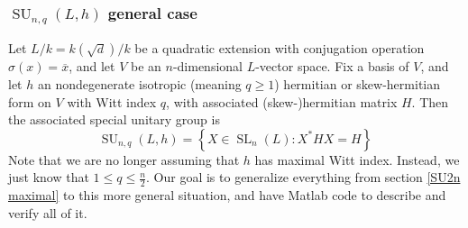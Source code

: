 \documentclass[12pt]{article}
\theoremstyle{definition}
\numberwithin{theorem}{subsection}
\newcommand{\sig}{\sigma}
\newcommand{\lb}{\left\{}
\newcommand{\rb}{\right\}}
\newcommand{\noi}{\noindent}
\newcommand{\ov}{\overline}
\DeclareMathOperator{\SL}{SL}
\DeclareMathOperator{\SU}{SU}
\begin{document}
\subsubsection{$\SU_{n,q}(L,h)$ general case}
\label{SUnq Lie algebra}

\noi Let $L/k = k(\sqrt{d})/k$ be a quadratic extension with conjugation operation $\sig(x) = \ov x$, and let $V$ be an $n$-dimensional $L$-vector space. Fix a basis of $V$, and let $h$ an nondegenerate isotropic (meaning $q \ge 1$) hermitian or skew-hermitian form on $V$ with Witt index $q$, with associated (skew-)hermitian matrix $H$. Then the associated special unitary group is
\[
	\SU_{n,q}(L,h) = \lb X \in \SL_{n}(L) : X^*HX = H \rb
\]
Note that we are no longer assuming that $h$ has maximal Witt index. Instead, we just know that $1 \le q \le \frac{n}{2}$. Our goal is to generalize everything from section \ref{SU2n maximal} to this more general situation, and have Matlab code to describe and verify all of it.
\end{document}
